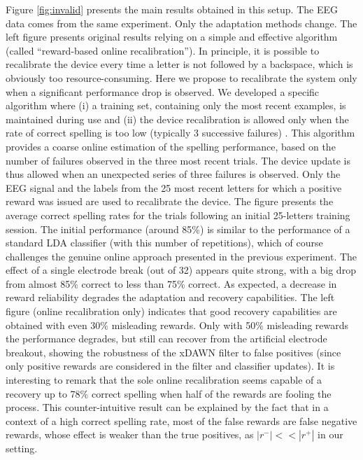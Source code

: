 \documentclass[conference]{IEEEtran}
\begin{document}
Figure \ref{fig:invalid} presents the main results obtained in this setup. The EEG data comes from the same experiment. 
Only the adaptation methods change. 
The left figure presents original results relying on a simple and effective algorithm (called ``reward-based online recalibration'').
In principle, it is possible to recalibrate the device every time a letter is not followed by a backspace, 
which is obviously too resource-consuming. Here we propose to recalibrate the system only when a significant performance drop is observed.
We developed a specific algorithm where (i) a training set, containing only the most recent examples, is maintained during use and 
(ii) the device recalibration is allowed only when the rate of correct spelling is too low (typically 3 successive failures) \cite{Dauce13}.
This algorithm provides a coarse online estimation of the spelling performance, based on the number of failures observed in the three
most recent trials. 
The device update is thus allowed when an unexpected series of three failures is observed.
Only the EEG signal and the labels from the 25 most recent letters for which a positive reward was issued are used to recalibrate the device.   
The figure presents the average correct spelling rates for the trials
following an initial 25-letters training session. The initial performance (around 85\%) is similar to 
the performance of a standard LDA classifier (with this number of repetitions), which of course challenges the genuine online approach
presented in the previous experiment.
The effect of 
a single electrode break (out of 32) appears quite strong, with a big drop from almost 85\% correct to less than
75\% correct.
As expected, a decrease in reward reliability degrades the adaptation
and recovery capabilities.
The left figure (online recalibration only) indicates that good recovery capabilities are obtained 
with even 30\% misleading rewards.
Only with 50\% misleading rewards the performance degrades, but still can recover from the artificial electrode breakout,
showing the robustness of the xDAWN filter to false positives (since only positive rewards are
considered in the filter and classifier updates). It is interesting to remark that the sole online recalibration  
seems capable of a recovery up to 78\% correct spelling when half of the rewards are fooling the process. 
This counter-intuitive result can be explained by the fact that in a context of a high correct spelling rate,
most of the false rewards are false negative rewards, whose effect is weaker than the true positives,
as $|r^-|<<|r^+|$ in our setting.
\end{document}
